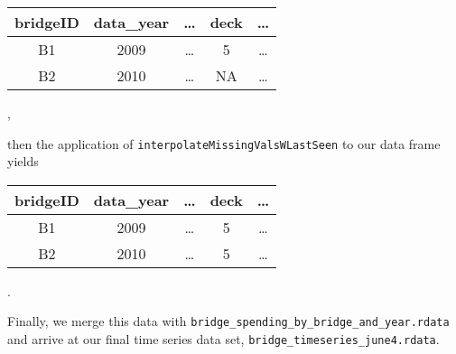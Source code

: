 \documentclass{article}
\begin{document}
\begin{center}
	\begin{tabular}{ccccc}
		bridgeID & data\_year &\ldots & deck & \ldots\\ \hline   
		B1 & 2009 &\ldots & 5 & \ldots\\
		B2 & 2010 &\ldots & NA & \ldots\\  
	\end{tabular},
\end{center}  
then the application of \texttt{interpolateMissingValsWLastSeen} to our data frame yields \begin{center}
	\begin{tabular}{ccccc}
		bridgeID & data\_year &\ldots & deck & \ldots\\ \hline   
		B1 & 2009 &\ldots & 5 & \ldots\\
		B2 & 2010 &\ldots & 5 & \ldots\\  
	\end{tabular}.
\end{center}   
Finally, we merge this data with \texttt{bridge\_spending\_by\_bridge\_and\_year.rdata} and arrive at our final time series data set, \texttt{bridge\_timeseries\_june4.rdata}. 
\end{document}
